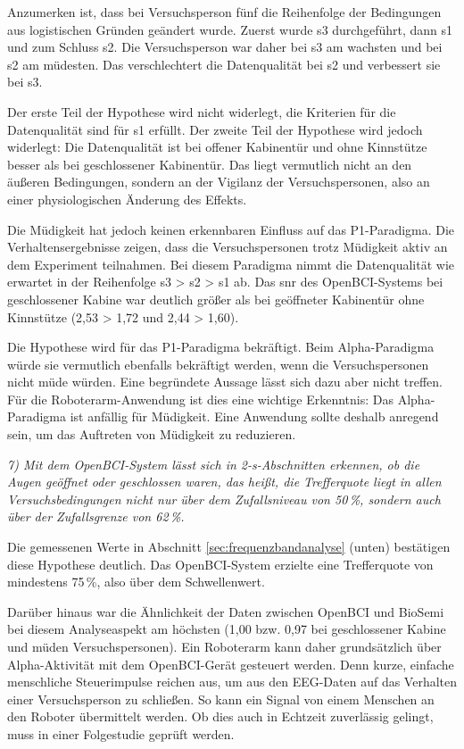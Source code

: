Anzumerken ist, dass bei Versuchsperson fünf die Reihenfolge der Bedingungen aus logistischen Gründen geändert wurde. Zuerst wurde s3 durchgeführt, dann s1 und zum Schluss s2. Die Versuchsperson war daher bei s3 am wachsten und bei s2 am müdesten. Das verschlechtert die Datenqualität bei s2 und verbessert sie bei s3.

Der erste Teil der Hypothese wird nicht widerlegt, die Kriterien für die Datenqualität sind für s1 erfüllt. Der zweite Teil der Hypothese wird jedoch widerlegt: Die Datenqualität ist bei offener Kabinentür und ohne Kinnstütze besser als bei geschlossener Kabinentür. Das liegt vermutlich nicht an den äußeren Bedingungen, sondern an der Vigilanz der Versuchspersonen, also an einer physiologischen Änderung des Effekts.

Die Müdigkeit hat jedoch keinen erkennbaren Einfluss auf das P1-Paradigma. Die Verhaltensergebnisse zeigen, dass die Versuchspersonen trotz Müdigkeit aktiv an dem Experiment teilnahmen. Bei diesem Paradigma nimmt die Datenqualität wie erwartet in der Reihenfolge s3 > s2 > s1 ab. Das \acrshort{snr} des OpenBCI-Systems bei geschlossener Kabine war deutlich größer als bei geöffneter Kabinentür ohne Kinnstütze (2,53 > 1,72 und 2,44 > 1,60).

Die Hypothese wird für das P1-Paradigma bekräftigt. Beim Alpha-Paradigma würde sie vermutlich ebenfalls bekräftigt werden, wenn die Versuchspersonen nicht müde würden. Eine begründete Aussage lässt sich dazu aber nicht treffen. Für die Roboterarm-Anwendung ist dies eine wichtige Erkenntnis: Das Alpha-Paradigma ist anfällig für Müdigkeit. Eine Anwendung sollte deshalb anregend sein, um das Auftreten von Müdigkeit zu reduzieren.

\textit{7) Mit dem OpenBCI-System lässt sich in 2-s-Abschnitten erkennen, ob die Augen geöffnet oder geschlossen waren, das heißt, die Trefferquote liegt in allen Versuchsbedingungen nicht nur über dem Zufallsniveau von 50\,\%, sondern auch über der Zufallsgrenze von 62\,\%.}

Die gemessenen Werte in Abschnitt \ref{sec:frequenzbandanalyse} (unten) bestätigen diese Hypothese deutlich. Das OpenBCI-System erzielte eine Trefferquote von mindestens 75\,\%, also über dem Schwellenwert.

Darüber hinaus war die Ähnlichkeit der Daten zwischen OpenBCI und BioSemi bei diesem Analyseaspekt am höchsten (1,00 bzw. 0,97 bei geschlossener Kabine und müden Versuchspersonen). Ein Roboterarm kann daher grundsätzlich über Alpha-Aktivität mit dem OpenBCI-Gerät gesteuert werden. Denn kurze, einfache menschliche Steuerimpulse reichen aus, um aus den EEG-Daten auf das Verhalten einer Versuchsperson zu schließen. So kann ein Signal von einem Menschen an den Roboter übermittelt werden. Ob dies auch in Echtzeit zuverlässig gelingt, muss in einer Folgestudie geprüft werden.
